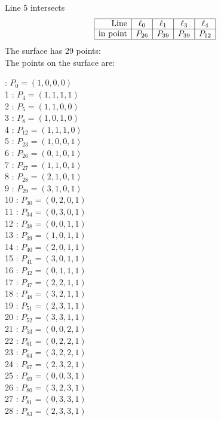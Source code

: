 \documentclass{article}
\begin{document}
{$$$$
Line 5 intersects 
$$
\begin{array}{|r*{4}{|c}|}
\hline
\mbox{Line}  & \ell_{0} & \ell_{1} & \ell_{3} & \ell_{4}\\
\hline
\mbox{in point}  & P_{26} & P_{39} & P_{39} & P_{12}\\
\hline
\end{array}
$$
The surface has 29 points:\\
The points on the surface are:\\
\begin{multicols}{3}
 : $P_{0}=( 1, 0, 0, 0 )$\\
1 : $P_{4}=( 1, 1, 1, 1 )$\\
2 : $P_{5}=( 1, 1, 0, 0 )$\\
3 : $P_{8}=( 1, 0, 1, 0 )$\\
4 : $P_{12}=( 1, 1, 1, 0 )$\\
5 : $P_{23}=( 1, 0, 0, 1 )$\\
6 : $P_{26}=( 0, 1, 0, 1 )$\\
7 : $P_{27}=( 1, 1, 0, 1 )$\\
8 : $P_{28}=( 2, 1, 0, 1 )$\\
9 : $P_{29}=( 3, 1, 0, 1 )$\\
10 : $P_{30}=( 0, 2, 0, 1 )$\\
11 : $P_{34}=( 0, 3, 0, 1 )$\\
12 : $P_{38}=( 0, 0, 1, 1 )$\\
13 : $P_{39}=( 1, 0, 1, 1 )$\\
14 : $P_{40}=( 2, 0, 1, 1 )$\\
15 : $P_{41}=( 3, 0, 1, 1 )$\\
16 : $P_{42}=( 0, 1, 1, 1 )$\\
17 : $P_{47}=( 2, 2, 1, 1 )$\\
18 : $P_{48}=( 3, 2, 1, 1 )$\\
19 : $P_{51}=( 2, 3, 1, 1 )$\\
20 : $P_{52}=( 3, 3, 1, 1 )$\\
21 : $P_{53}=( 0, 0, 2, 1 )$\\
22 : $P_{61}=( 0, 2, 2, 1 )$\\
23 : $P_{64}=( 3, 2, 2, 1 )$\\
24 : $P_{67}=( 2, 3, 2, 1 )$\\
25 : $P_{69}=( 0, 0, 3, 1 )$\\
26 : $P_{80}=( 3, 2, 3, 1 )$\\
27 : $P_{81}=( 0, 3, 3, 1 )$\\
28 : $P_{83}=( 2, 3, 3, 1 )$\\
\end{multicols}


}
\end{document}
